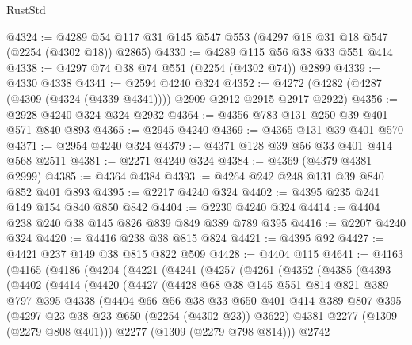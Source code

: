\begin{lexlean}{RustStd}
\begin{coremodule}
@4324 := @4289 @54 @117 @31 @145 @547 @553 (@4297 @18 @31 @18 @547 (@2254 (@4302 @18)) @2865)
@4330 := @4289 @115 @56 @38 @33 @551 @414
@4338 := @4297 @74 @38 @74 @551 (@2254 (@4302 @74)) @2899
@4339 := @4330 @4338
@4341 := @2594 @4240 @324
@4352 := @4272 (@4282 (@4287 (@4309 (@4324 (@4339 @4341)))) @2909 @2912 @2915 @2917 @2922)
@4356 := @2928 @4240 @324 @324 @2932
@4364 := @4356 @783 @131 @250 @39 @401 @571 @840 @893
@4365 := @2945 @4240
@4369 := @4365 @131 @39 @401 @570
@4371 := @2954 @4240 @324
@4379 := @4371 @128 @39 @56 @33 @401 @414 @568 @2511
@4381 := @2271 @4240 @324
@4384 := @4369 (@4379 @4381 @2999)
@4385 := @4364 @4384
@4393 := @4264 @242 @248 @131 @39 @840 @852 @401 @893
@4395 := @2217 @4240 @324
@4402 := @4395 @235 @241 @149 @154 @840 @850 @842
@4404 := @2230 @4240 @324
@4414 := @4404 @238 @240 @38 @145 @826 @839 @849 @389 @789 @395
@4416 := @2207 @4240 @324
@4420 := @4416 @238 @38 @815 @824
@4421 := @4395 @92
@4427 := @4421 @237 @149 @38 @815 @822 @509
@4428 := @4404 @115
@4641 := @4163
    (@4165
      (@4186
        (@4204
          (@4221
            (@4241
              (@4257
                (@4261
                  (@4352
                    (@4385
                      (@4393
                        (@4402
                          (@4414
                            (@4420
                              (@4427
                                (@4428
                                  @68
                                  @38
                                  @145
                                  @551
                                  @814
                                  @821
                                  @389
                                  @797
                                  @395
                                  @4338
                                  (@4404
                                    @66
                                    @56
                                    @38
                                    @33
                                    @650
                                    @401
                                    @414
                                    @389
                                    @807
                                    @395
                                    (@4297 @23 @38 @23 @650 (@2254 (@4302 @23)) @3622)
                                    @4381
                                    @2277
                                    (@1309 (@2279 @808 @401)))
                                  @2277
                                  (@1309 (@2279 @798 @814)))
                                @2742

\end{coremodule}
\end{lexlean}
